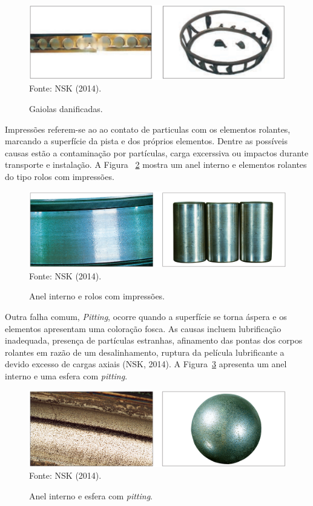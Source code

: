 \documentclass[
	12pt,				
	oneside,			
	a4paper,			
	english,			
	brazil,			
	]{abntex2ppgsi}
\begin{document}
\begin{figure}[H]
\centering
\caption {Gaiolas danificadas.}
\includegraphics[width=\textwidth,height=\textheight,keepaspectratio]{gaiola_nsk} \\
Fonte: NSK (2014).
\label{gaiola_nsk}
\end{figure}

Impressões referem-se ao ao contato de particulas com os elementos rolantes, marcando a superfície da pista e dos próprios elementos. Dentre as possíveis causas estão a contaminação por partículas, carga excerssiva ou impactos durante transporte e instalação. A Figura ~\ref{impressoes_nsk} mostra um anel interno e elementos rolantes do tipo rolos com impressões. 

\begin{figure}[H]
\centering
\caption {Anel interno e rolos com impressões.}
\includegraphics[width=\textwidth,height=\textheight,keepaspectratio]{impressoes_nsk} \\
Fonte: NSK (2014).
\label{impressoes_nsk}
\end{figure}

Outra falha comum, \textit{Pitting}, ocorre quando a superfície se torna áspera e os elementos apresentam uma coloração fosca. As causas incluem lubrificação inadequada, presença de partículas estranhas, afinamento das pontas dos corpos rolantes em razão de um desalinhamento, ruptura da película lubrificante a devido excesso de cargas axiais (NSK, 2014). A Figura~\ref{pitting_nsk} apresenta um anel interno e uma esfera com \textit{pitting}.

\begin{figure}[H]
\centering
\caption {Anel interno e esfera com \textit{pitting}.}
\includegraphics[width=\textwidth,height=\textheight,keepaspectratio]{pitting_nsk} \\
Fonte: NSK (2014).
\label{pitting_nsk}
\end{figure}
\end{document}

